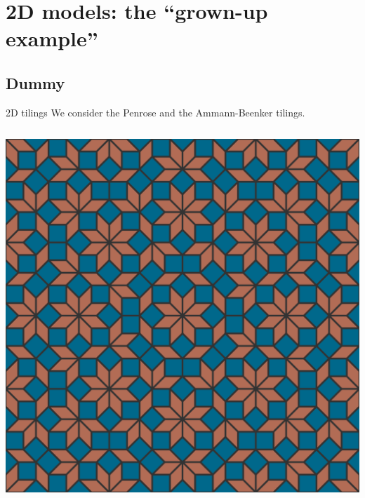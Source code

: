 \documentclass[xcolor=x11names,compress,professionalfonts, aspectratio=169]{beamer}
\author{Nicolas Macé}
\renewcommand{\(}{\begin{columns}}
\renewcommand{\)}{\end{columns}}
\newcommand{\<}[1]{\begin{column}{#1}}
\renewcommand{\>}{\end{column}}
\begin{document}
\section{2D models: the ``grown-up example''}
\subsection{Dummy}

\begin{frame}{2D tilings}
We consider the Penrose and the Ammann-Beenker tilings.
\begin{columns}
\begin{column}{5cm}
{\centering
\includegraphics[scale=.08]{img/ammann-beenker.png}

}
\end{column}
\end{columns}
\end{frame}
\end{document}
